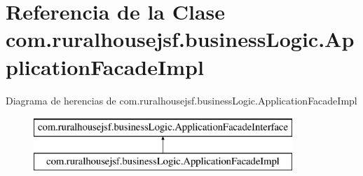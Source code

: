 \hypertarget{classcom_1_1ruralhousejsf_1_1business_logic_1_1_application_facade_impl}{}\section{Referencia de la Clase com.\+ruralhousejsf.\+business\+Logic.\+Application\+Facade\+Impl}
\label{classcom_1_1ruralhousejsf_1_1business_logic_1_1_application_facade_impl}
Diagrama de herencias de com.\+ruralhousejsf.\+business\+Logic.\+Application\+Facade\+Impl\begin{figure}[H]
\begin{center}
\leavevmode
\includegraphics[height=2.000000cm]{classcom_1_1ruralhousejsf_1_1business_logic_1_1_application_facade_impl}
\end{center}
\end{figure}
